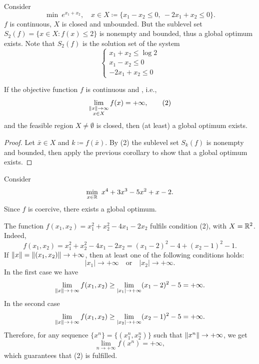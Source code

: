 \begin{example}
Consider
\[
    \min\ e^{x_1 + x_2}, \quad x \in X \coloneqq \{x_1 - x_2 \le 0,\ -2x_1 + x_2 \le 0\}.
\]
$f$ is continuous, $X$ is closed and unbounded. But the sublevel set $S_2(f) = \{x \in X : f(x) \le 2\}$ is nonempty and bounded, thus a global optimum exists.
Note that $S_2(f)$ is the solution set of the system
\[
    \begin{cases}
        x_1 + x_2 \le \log 2 \\
        x_1 - x_2 \le 0 \\
        -2x_1 + x_2 \le 0
    \end{cases}
\]
\end{example}

\begin{corollary}
If the objective function $f$ is continuous and , i.e.,
\[
    \lim_{\substack{\left\lVert x \right\rVert \to \infty \\ x \in X}} f(x) = +\infty, \tag{2}
\]
and the feasible region $X \ne \emptyset$ is closed, then (at least) a global optimum exists.
\end{corollary}
\begin{proof}
Let $\bar{x} \in X$ and $k \coloneqq f(\bar{x})$. By (2) the sublevel set $S_k(f)$ is nonempty and bounded, then apply the previous corollary to show that a global optimum exists.
\end{proof}

\begin{example}
Consider
\[
    \min_{x \in \mathbb{R}}\ x^4 + 3x^3 - 5x^2 + x - 2.
\]
Since $f$ is coercive, there exists a global optimum.
\end{example}

\begin{example}
The function $f(x_1, x_2) = x_1^2 + x_2^2 - 4x_1 - 2x_2$ fulfils condition (2), with $X = \mathbb{R}^2$.
Indeed,
\[
    f(x_1, x_2) = x_1^2 + x_2^2 - 4x_1 - 2x_2 = (x_1 - 2)^2 - 4 + (x_2 - 1)^2 - 1.
\]
If $\left\lVert x \right\rVert = \left\lVert (x_1, x_2) \right\rVert \to +\infty$, then at least one of the following conditions holds:
\[
    |x_1| \to +\infty \quad \text{or} \quad |x_2| \to +\infty.
\]
In the first case we have
\[
    \lim_{\left\lVert x \right\rVert \to +\infty} f(x_1, x_2) \ge \lim_{|x_1| \to +\infty} (x_1 - 2)^2 - 5 = +\infty.
\]
In the second case
\[
    \lim_{\left\lVert x \right\rVert \to +\infty} f(x_1, x_2) \ge \lim_{|x_2| \to +\infty} (x_2 - 1)^2 - 5 = +\infty.
\]
Therefore, for any sequence $\{x^n\} = \{(x_1^n, x_2^n)\}$ such that $\left\lVert x^n \right\rVert \to +\infty$, we get
\[
    \lim_{n \to +\infty} f(x^n) = +\infty,
\]
which guarantees that (2) is fulfilled.
\end{example}
